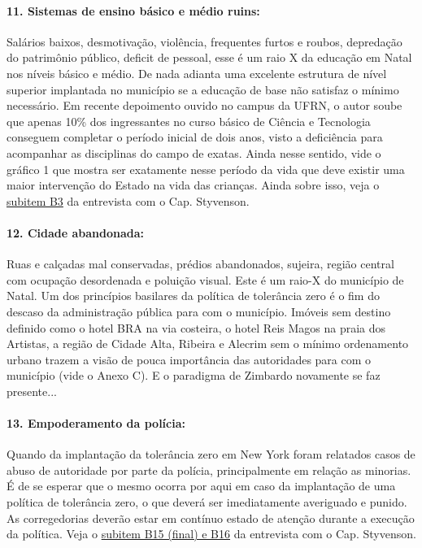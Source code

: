 \documentclass[
	12pt,				%
	openright,			%
	twoside,			%
	a4paper,			%
	chapter=TITLE,		%
	section=TITLE,		%
	subsection=TITLE,	%
	subsubsection=TITLE,%
	spanish,            %
	english,			%
	brazil				%
	]{abntex2}
\begin{document}
\paragraph*{\textbf{11. Sistemas de ensino básico e médio ruins:}} Salários baixos, desmotivação, violência, frequentes furtos e roubos, depredação do patrimônio público, deficit de pessoal, esse é um raio X da educação em Natal nos níveis básico e médio. De nada adianta uma excelente estrutura de nível superior implantada no município se a educação de base não satisfaz o mínimo necessário. Em recente depoimento ouvido no campus da UFRN, o autor soube que apenas 10\% dos ingressantes no curso básico de Ciência e Tecnologia conseguem completar o período inicial de dois anos, visto a deficiência para acompanhar as disciplinas do campo de exatas. Ainda nesse sentido, vide o gráfico 1 que mostra ser exatamente nesse período da vida que deve existir uma maior intervenção do Estado na vida das crianças. Ainda sobre isso, veja o \hyperlink{B3}{subitem B3} da entrevista com o Cap. Styvenson.
\hypertarget{W12}{}
\paragraph*{\textbf{12. Cidade abandonada:}} Ruas e calçadas mal conservadas, prédios abandonados, sujeira, região central com ocupação desordenada e poluição visual. Este é um raio-X do município de Natal. Um dos princípios basilares da política de tolerância zero é o fim do descaso da administração pública para com o município. Imóveis sem destino definido como o hotel BRA na via costeira, o hotel Reis Magos na praia dos Artistas, a região de Cidade Alta, Ribeira e Alecrim sem o mínimo ordenamento urbano trazem a visão de pouca importância das autoridades para com o município (vide o Anexo C). E o paradigma de Zimbardo novamente se faz presente...
\hypertarget{W13}{}
\paragraph*{\textbf{13. Empoderamento da polícia:}} Quando da implantação da tolerância zero em New York foram relatados casos de abuso de autoridade por parte da polícia, principalmente em relação as minorias. É de se esperar que o mesmo ocorra por aqui em caso da implantação de uma política de tolerância zero, o que deverá ser imediatamente averiguado e punido. As corregedorias deverão estar em contínuo estado de atenção durante a execução da política. Veja o \hyperlink{B15A}{subitem B15 (final) e B16} da entrevista com o Cap. Styvenson.\\
\end{document}
